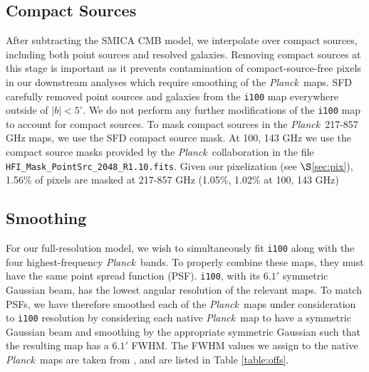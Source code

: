 \documentclass{emulateapj}
\newcommand{\PLANCK}{{\it Planck}}
\begin{document}
\subsection{Compact Sources}
\label{sec:ptsrc}
After subtracting the SMICA CMB model, we interpolate over compact sources, 
including both point sources and resolved galaxies. Removing compact sources at
this stage is important as it prevents contamination of compact-source-free 
pixels in our downstream analyses which require smoothing of the \PLANCK~maps. 
SFD carefully removed point sources and galaxies from the \verb|i100| map 
everywhere outside of $|b|$$<$$5^{\circ}$. We do not perform any further 
modifications of the \verb|i100| map to account for compact sources. To mask 
compact sources in the \PLANCK~217-857 GHz maps, we use the SFD compact source 
mask. At 100, 143 GHz we use the compact source masks provided by the 
\PLANCK~collaboration in the file \verb|HFI_Mask_PointSrc_2048_R1.10.fits|. 
Given our pixelization (see $\S$\ref{sec:pix}), 1.56\% of pixels are masked 
at 217-857 GHz (1.05\%, 1.02\% at 100, 143 GHz) 


\subsection{Smoothing}
\label{sec:smth}
For our full-resolution model, we wish to simultaneously fit \verb|i100| along 
with the four highest-frequency \PLANCK~bands. To properly combine these maps, 
they must have the same point spread function (PSF). \verb|i100|, with its 
$6.1'$ symmetric Gaussian beam, has the lowest angular resolution of the 
relevant maps. To match PSFs, we have therefore smoothed each of the 
\PLANCK~maps under consideration to \verb|i100| resolution by considering each 
native \PLANCK~map to have a symmetric Gaussian beam and smoothing by the 
appropriate symmetric Gaussian such that the resulting map has a  $6.1'$ FWHM. 
The FWHM values we assign to the native \PLANCK~maps are taken from 
\cite{planckbeam}, and are listed in Table \ref{table:offs}.
\end{document}
